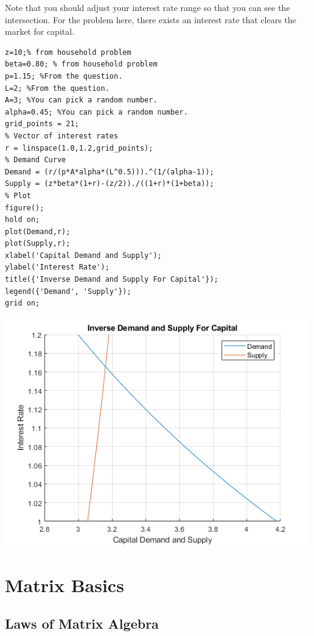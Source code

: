 \documentclass[
]{book}
\begin{document}
Note that you should adjust your interest rate range so that you can see
the intersection. For the problem here, there exists an interest rate
that clears the market for capital.

\begin{verbatim}
z=10;% from household problem
beta=0.80; % from household problem
p=1.15; %From the question.
L=2; %From the question.
A=3; %You can pick a random number.
alpha=0.45; %You can pick a random number.
grid_points = 21;
% Vector of interest rates
r = linspace(1.0,1.2,grid_points);
% Demand Curve
Demand = (r/(p*A*alpha*(L^0.5))).^(1/(alpha-1));
Supply = (z*beta*(1+r)-(z/2))./((1+r)*(1+beta));
% Plot
figure();
hold on;
plot(Demand,r);
plot(Supply,r);
xlabel('Capital Demand and Supply');
ylabel('Interest Rate');
title({'Inverse Demand and Supply For Capital'});
legend({'Demand', 'Supply'});
grid on;
\end{verbatim}

\includegraphics[width=5.20833in,height=\textheight]{img/K_borrow_firm_images/figure_2.png}

\hypertarget{matrix-basics}{%
\chapter{Matrix Basics}\label{matrix-basics}}

\hypertarget{laws-of-matrix-algebra}{%
\section{Laws of Matrix Algebra}\label{laws-of-matrix-algebra}}
\end{document}
